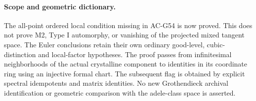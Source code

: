 \paragraph{Scope and geometric dictionary.}
The all-point ordered local condition missing in
AC-G54 is now proved.  This does not prove M2,
Type I automorphy, or vanishing of the projected
mixed tangent space.  The Euler conclusions retain
their own ordinary good-level, cubic-distinction
and local-factor hypotheses.  The proof passes
from infinitesimal neighborhoods of the actual
crystalline component to identities in its
coordinate ring using an injective formal chart.
The subsequent flag is obtained by explicit
spectral idempotents and matrix identities.
No new Grothendieck archival identification or
geometric comparison with the adele-class space
is asserted.
